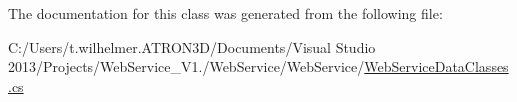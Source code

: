 The documentation for this class was generated from the following file\+:\begin{DoxyCompactItemize}
\item 
C\+:/\+Users/t.\+wilhelmer.\+A\+T\+R\+O\+N3\+D/\+Documents/\+Visual Studio 2013/\+Projects/\+Web\+Service\+\_\+\+V1./\+Web\+Service/\+Web\+Service/\hyperlink{_web_service_data_classes_8cs}{Web\+Service\+Data\+Classes.\+cs}\end{DoxyCompactItemize}
